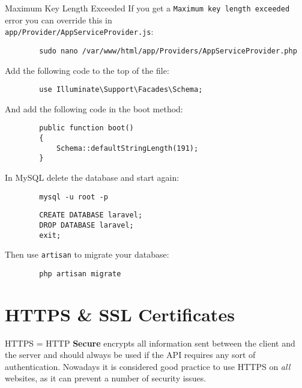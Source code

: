 \begin{infobox}{Maximum Key Length Exceeded}
    If you get a \texttt{Maximum key length exceeded} error you can override this in\\ \texttt{app/Provider/AppServiceProvider.js}:

    \begin{verbatim}
        sudo nano /var/www/html/app/Providers/AppServiceProvider.php
    \end{verbatim}

    Add the following code to the top of the file:

    \begin{verbatim}
        use Illuminate\Support\Facades\Schema;
    \end{verbatim}

    And add the following code in the boot method:

    \begin{verbatim}
        public function boot()
        {
            Schema::defaultStringLength(191);
        }
    \end{verbatim}

    In MySQL delete the database and start again:

    \begin{verbatim}
        mysql -u root -p
    \end{verbatim}

    \begin{verbatim}
        CREATE DATABASE laravel;
        DROP DATABASE laravel;
        exit;
    \end{verbatim}

    Then use \texttt{artisan} to migrate your database:

    \begin{verbatim}
        php artisan migrate
    \end{verbatim}
\end{infobox}


\section{HTTPS \& SSL Certificates}

HTTPS = HTTP \textbf{Secure} encrypts all information sent between the client and the server and should always be used if the API requires any sort of authentication. Nowadays it is considered good practice to use HTTPS on \textit{all} websites, as it can prevent a number of security issues.
\\

